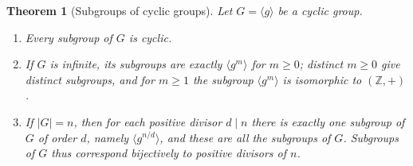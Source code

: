 \documentclass[11pt,a4paper]{article}
\newtheorem{theorem}{Theorem}[section]
\theoremstyle{definition}
\theoremstyle{remark}
\newcommand{\Z}{\ensuremath{\mathbb{Z}}}
\providecommand{\abs}[1]{\lvert #1 \rvert}
\begin{document}
\begin{theorem}[Subgroups of cyclic groups]\label{groups:thm-cyclic-subgroups}
Let \(G = \langle g\rangle\) be a cyclic group.
\begin{enumerate}
\item Every subgroup of \(G\) is cyclic.
\item If \(G\) is infinite, its subgroups are exactly
  \(\langle g^m\rangle\) for \(m \ge 0\); distinct \(m \ge 0\) give
  distinct subgroups, and for \(m \ge 1\) the subgroup
  \(\langle g^m\rangle\) is isomorphic to \((\Z,+)\).
\item If \(\abs{G} = n\), then for each positive divisor \(d \mid n\)
  there is exactly one subgroup of \(G\) of order \(d\), namely
  \(\langle g^{n/d}\rangle\), and these are all the subgroups of \(G\).
  Subgroups of \(G\) thus correspond bijectively to positive divisors of
  \(n\).
\end{enumerate}
\end{theorem}
\end{document}
